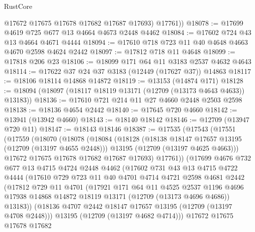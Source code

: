 \begin{lexlean}{RustCore}
\begin{coremodule}
          @17672
          @17675
          @17678
          @17682
          @17687
          @17693)
        @17761))
@18078 := @17699 @4619 @725 @677 @13 @4664 @4673 @2448 @4462
@18084 := @17602 @724 @43 @13 @4664 @4671 @4444
@18094 := @17610 @718 @723 @11 @40 @4648 @4663 @4670 @2598 @4624 @2442
@18097 := @17812 @718 @11 @4648
@18099 := @17818 @206 @23
@18106 := @18099 @171 @64 @11 @3183 @2537 @4632 @4643
@18114 := @17622 @37 @24 @37 @3183 (@12449 (@17627 @37)) @14863
@18117 := @18106 @18114 @14868 @14872
@18119 := @13153 (@14874 @171)
@18128 := @18094 (@18097 (@18117 @18119 @13171 (@12709 (@13173 @4643 @4633)) @13183))
@18136 := @17610 @721 @214 @11 @27 @4660 @2448 @2503 @2598
@18138 := @18136 @4654 @2442
@18140 := @17645 @720 @4660
@18142 := @13941 (@13942 @4660)
@18143 := @18140 @18142
@18146 := @12709 (@13947 @720 @11)
@18147 := @18143 @18146
@18387 := @17535
    (@17543
      (@17551
        (@17559
          (@18070
            (@18078
              (@18084
                (@18128
                  (@18138 @18147 @17657 @13195 (@12709 (@13197 @4655 @2448)))
                  @13195
                  (@12709 (@13197 @4625 @4663)))
                @17672
                @17675
                @17678
                @17682
                @17687
                @17693)
              @17761))
          (@17699
            @4676
            @732
            @677
            @13
            @4715
            @4724
            @2448
            @4462
            (@17602
              @731
              @43
              @13
              @4715
              @4722
              @4444
              (@17610
                @729
                @723
                @11
                @40
                @4701
                @4714
                @4721
                @2598
                @4681
                @2442
                (@17812
                  @729
                  @11
                  @4701
                  (@17921
                    @171
                    @64
                    @11
                    @4525
                    @2537
                    @1196
                    @4696
                    @17938
                    @14868
                    @14872
                    @18119
                    @13171
                    (@12709 (@13173 @4696 @4686))
                    @13183))
                (@18136 @4707 @2442 @18147 @17657 @13195 (@12709 (@13197 @4708 @2448)))
                @13195
                (@12709 (@13197 @4682 @4714)))
              @17672
              @17675
              @17678
              @17682

\end{coremodule}
\end{lexlean}
